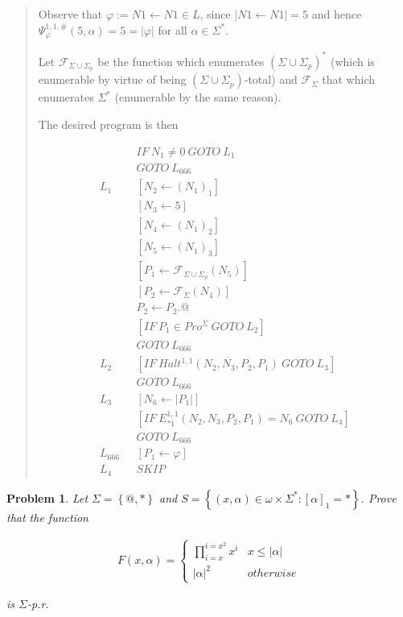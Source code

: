 \documentclass[a4paper, 12pt]{article}
\newtheorem{problem}{Problem}
\newtheorem{problem}{Problem}
\begin{document}
\small
\begin{quote}

Observe that $\varphi := N1 \leftarrow N1 \in L$, since $|N 1 \leftarrow N
1 | = 5$ and hence $\Psi_{\varphi}^{1, 1, \#}(5, \alpha) = 5 = |\varphi|$ for
all $\alpha \in \Sigma^{*}$.

Let $\mathcal{F}_{\Sigma \cup \Sigma_p}$ be the function which enumerates $(\Sigma \cup \Sigma_p)^{*}$
(which is enumerable by virtue of being $(\Sigma \cup \Sigma_p)$-total) and
$\mathcal{F}_{\Sigma}$ that which enumerates $\Sigma^{*}$ (enumerable by the
same reason).

The desired program is then 

\begin{align*}
    &IF ~ N_1 \neq 0 ~ GOTO ~ L_1 \\ 
    &GOTO ~ L_{666} \\ 
    L_1~ ~ ~& [N_2 \leftarrow (N_1)_1] \\ 
    &[N_3 \leftarrow 5] \\ 
    &[N_4 \leftarrow (N_1)_2] \\ 
    &[N_5 \leftarrow (N_1)_3] \\ 
    &[P_1 \leftarrow \mathcal{F}_{\Sigma \cup \Sigma_p}(N_5)] \\ 
    &[P_2 \leftarrow \mathcal{F}_{\Sigma}(N_4)] \\ 
    &P_2 \leftarrow P_2.@ \\ 
    &[IF ~ P_1 \in Pro^{\Sigma} ~ GOTO ~ L_2]\\ 
    &GOTO ~ L_{666}\\
    L_2 ~ ~ ~ &[IF ~ Halt^{1, 1}(N_2, N_3, P_2, P_1 ) ~ GOTO ~ L_3]\\ 
              &GOTO ~ L_{666} \\ 
    L_3 ~ ~ ~ &[N_6 \leftarrow  |P_1|]\\
              &[IF ~ E^{1, 1}_{*1}(N_2, N_3, P_2, P_1 ) = N_6 ~ GOTO ~ L_4]\\ 
              &GOTO ~ L_{666}\\ 
    L_{666} ~ ~ ~ &[P_1 \leftarrow \varphi] \\ 
    L_4 ~ ~ ~ &SKIP
\end{align*}

\end{quote}
\normalsize

\begin{problem}
    Let $\Sigma = \left\{ @, * \right\} $ and $S = \left\{ (x, \alpha) \in
    \omega \times \Sigma^{*} : [\alpha]_1 = * \right\} $. Prove that the
    function 

    \begin{align*}
        F(x, \alpha) = \begin{cases}
            \prod_{i=x}^{i = x^2}  x^i & x \leq |\alpha| \\ 
            |\alpha|^2 & otherwise
        \end{cases}
    \end{align*}

    is $\Sigma$-p.r. 
\end{problem}
\end{document}

